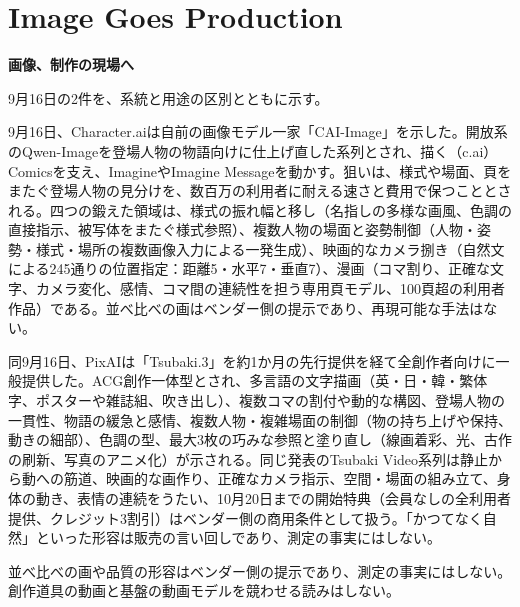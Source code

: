 \section{Image Goes Production}
\begin{wideflow}
{\Large\bfseries 画像、制作の現場へ}\par
\smallskip
{\color{SurveyMuted}9月16日の2件を、系統と用途の区別とともに示す。}\par
\end{wideflow}

9月16日、Character.aiは自前の画像モデル一家「CAI-Image」を示した\cite{caiimage}。開放系のQwen-Imageを登場人物の物語向けに仕上げ直した系列とされ、描く（c.ai）Comicsを支え、ImagineやImagine Messageを動かす。狙いは、様式や場面、頁をまたぐ登場人物の見分けを、数百万の利用者に耐える速さと費用で保つこととされる。四つの鍛えた領域は、様式の振れ幅と移し（名指しの多様な画風、色調の直接指示、被写体をまたぐ様式参照）、複数人物の場面と姿勢制御（人物・姿勢・様式・場所の複数画像入力による一発生成）、映画的なカメラ捌き（自然文による245通りの位置指定：距離5・水平7・垂直7）、漫画（コマ割り、正確な文字、カメラ変化、感情、コマ間の連続性を担う専用頁モデル、100頁超の利用者作品）である。並べ比べの画はベンダー側の提示であり、再現可能な手法はない。

同9月16日、PixAIは「Tsubaki.3」を約1か月の先行提供を経て全創作者向けに一般提供した\cite{tsubaki}。ACG創作一体型とされ、多言語の文字描画（英・日・韓・繁体字、ポスターや雑誌組、吹き出し）、複数コマの割付や動的な構図、登場人物の一貫性、物語の緩急と感情、複数人物・複雑場面の制御（物の持ち上げや保持、動きの細部）、色調の型、最大3枚の巧みな参照と塗り直し（線画着彩、光、古作の刷新、写真のアニメ化）が示される。同じ発表のTsubaki Video系列は静止から動への筋道、映画的な画作り、正確なカメラ指示、空間・場面の組み立て、身体の動き、表情の連続をうたい、10月20日までの開始特典（会員なしの全利用者提供、クレジット3割引）はベンダー側の商用条件として扱う。「かつてなく自然」といった形容は販売の言い回しであり、測定の事実にはしない。

\begin{claimboundary}[制作画像の境界]
並べ比べの画や品質の形容はベンダー側の提示であり、測定の事実にはしない。創作道具の動画と基盤の動画モデルを競わせる読みはしない。
\end{claimboundary}

